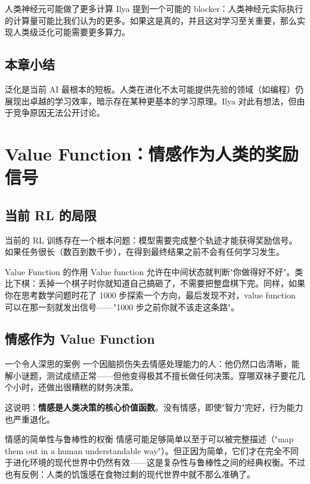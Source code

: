 \documentclass[a4paper]{article}
\begin{document}
\begin{knowledgebox}{人类神经元可能做了更多计算}
Ilya 提到一个可能的 blocker：人类神经元实际执行的计算量可能比我们认为的更多。如果这是真的，并且这对学习至关重要，那么实现人类级泛化可能需要更多算力。
\end{knowledgebox}

\subsection{本章小结}

泛化是当前 AI 最根本的短板。人类在进化不太可能提供先验的领域（如编程）仍展现出卓越的学习效率，暗示存在某种更基本的学习原理。Ilya 对此有想法，但由于竞争原因无法公开讨论。


\section{Value Function：情感作为人类的奖励信号}

\subsection{当前 RL 的局限}

当前的 RL 训练存在一个根本问题：模型需要完成整个轨迹才能获得奖励信号。如果任务很长（数百到数千步），在得到最终结果之前不会有任何学习发生。

\begin{importantbox}{Value Function 的作用}
Value function 允许在中间状态就判断"你做得好不好"。类比下棋：丢掉一个棋子时你就知道自己搞砸了，不需要把整盘棋下完。同样，如果你在思考数学问题时花了 1000 步探索一个方向，最后发现不对，value function 可以在那一刻就发出信号——"1000 步之前你就不该走这条路"。
\end{importantbox}

\subsection{情感作为 Value Function}

\begin{importantbox}{一个令人深思的案例}
一个因脑损伤失去情感处理能力的人：他仍然口齿清晰，能解小谜题，测试成绩正常——但他变得极其不擅长做任何决策。穿哪双袜子要花几个小时，还做出很糟糕的财务决策。

这说明：\textbf{情感是人类决策的核心价值函数}。没有情感，即使"智力"完好，行为能力也严重退化。
\end{importantbox}

\begin{knowledgebox}{情感的简单性与鲁棒性的权衡}
情感可能足够简单以至于可以被完整描述（"map them out in a human understandable way"）。但正因为简单，它们才在完全不同于进化环境的现代世界中仍然有效——这是复杂性与鲁棒性之间的经典权衡。不过也有反例：人类的饥饿感在食物过剩的现代世界中就不那么准确了。
\end{knowledgebox}
\end{document}

